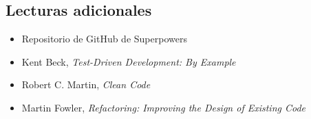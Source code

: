 \documentclass[a4paper]{article}
\begin{document}
\subsection{Lecturas adicionales}

\begin{itemize}
    \item Repositorio de GitHub de Superpowers
    \item Kent Beck, \textit{Test-Driven Development: By Example}
    \item Robert C. Martin, \textit{Clean Code}
    \item Martin Fowler, \textit{Refactoring: Improving the Design of Existing Code}
\end{itemize}

\end{document}

